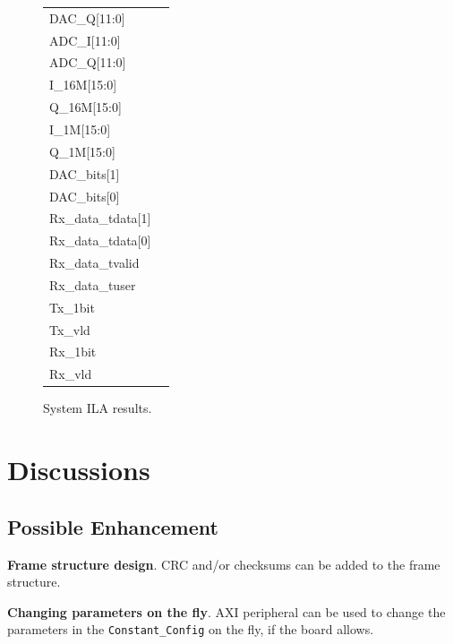 \documentclass[journal,twoside]{IEEEtran}
\begin{document}
\begin{figure}
{\begin{tabularx}{\linewidth}{@{}lX@{}}
          DAC\_Q[11:0] &  \\
          ADC\_I[11:0] &  \\
          ADC\_Q[11:0] &  \\
          I\_16M[15:0] &  \\
          Q\_16M[15:0] &  \\
          I\_1M[15:0] &  \\
          Q\_1M[15:0] &  \\
          DAC\_bits[1] &  \\
          DAC\_bits[0] &  \\
          Rx\_data\_tdata[1] &  \\
          Rx\_data\_tdata[0] &  \\
          Rx\_data\_tvalid &  \\
          Rx\_data\_tuser &  \\
          Tx\_1bit &  \\
          Tx\_vld &  \\
          Rx\_1bit &  \\
          Rx\_vld &  \\
        \end{tabularx}%
      }
      \caption{System ILA results.}
    \end{figure}

  \section{Discussions}

    \subsection{Possible Enhancement}

      \textbf{Frame structure design}.
      CRC and/or checksums can be added to the frame structure.

      \textbf{Changing parameters on the fly}.
      AXI peripheral \cite{xilinx:pg127} can be used to change the parameters in the \texttt{Constant\_Config} on the fly,
      if the board allows.
\end{document}
